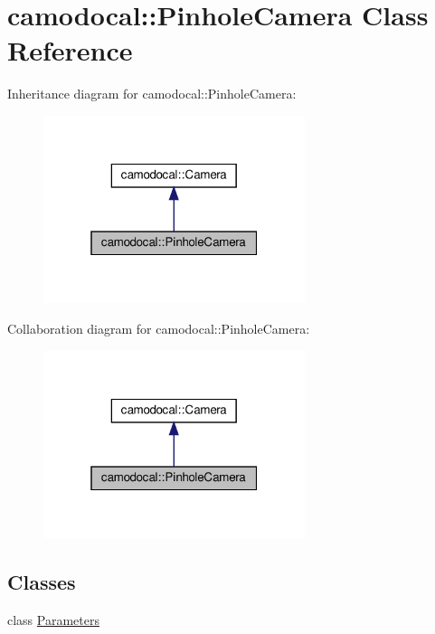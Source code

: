 \hypertarget{classcamodocal_1_1PinholeCamera}{}\section{camodocal\+:\+:Pinhole\+Camera Class Reference}
\label{classcamodocal_1_1PinholeCamera}


Inheritance diagram for camodocal\+:\+:Pinhole\+Camera\+:\nopagebreak
\begin{figure}[H]
\begin{center}
\leavevmode
\includegraphics[width=217pt]{classcamodocal_1_1PinholeCamera__inherit__graph}
\end{center}
\end{figure}


Collaboration diagram for camodocal\+:\+:Pinhole\+Camera\+:\nopagebreak
\begin{figure}[H]
\begin{center}
\leavevmode
\includegraphics[width=217pt]{classcamodocal_1_1PinholeCamera__coll__graph}
\end{center}
\end{figure}
\subsection*{Classes}
\begin{DoxyCompactItemize}
\item 
class \hyperlink{classcamodocal_1_1PinholeCamera_1_1Parameters}{Parameters}
\end{DoxyCompactItemize}
